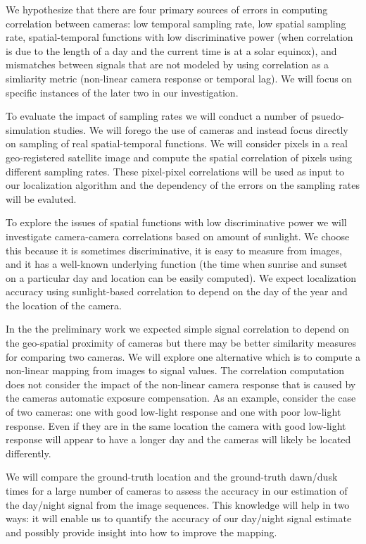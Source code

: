 We hypothesize that there are four primary sources of errors in
computing correlation between cameras: low temporal sampling rate, low
spatial sampling rate, spatial-temporal functions with low
discriminative power (\eg when correlation is due to the length of a
day and the current time is at a solar equinox), and mismatches
between signals that are not modeled by using correlation as a
simliarity metric (\eg non-linear camera response or temporal lag).
We will focus on specific instances of the later two in our
investigation. 

To evaluate the impact of sampling rates we will conduct a number of
psuedo-simulation studies.  We will forego the use of cameras and
instead focus directly on sampling of real spatial-temporal functions.
We will consider pixels in a real geo-registered satellite image and
compute the spatial correlation of pixels using different sampling
rates.  These pixel-pixel correlations will be used as input to our
localization algorithm and the dependency of the errors on the
sampling rates will be evaluted.

To explore the issues of spatial functions with low discriminative
power we will investigate camera-camera correlations based on amount
of sunlight.  We choose this because it is sometimes discriminative,
it is easy to measure from images, and it has a well-known underlying
function (\ie the time when sunrise and sunset on a particular day and
location can be easily computed).  We expect localization accuracy
using sunlight-based correlation to depend on the day of the year and
the location of the camera.

In the the preliminary work we expected simple signal correlation to
depend on the geo-spatial proximity of cameras but there may be better
similarity measures for comparing two cameras.  We will explore one
alternative which is to compute a non-linear mapping from images to
signal values.  The correlation computation does not consider the
impact of the non-linear camera response that is caused by the cameras
automatic exposure compensation.  As an example, consider the case of
two cameras: one with good low-light response and one with poor
low-light response.  Even if they are in the same location the camera
with good low-light response will appear to have a longer day and the
cameras will likely be located differently.

We will compare the ground-truth location and the ground-truth
dawn/dusk times for a large number of cameras to assess the accuracy
in our estimation of the day/night signal from the image sequences.
This knowledge will help in two ways: it will enable us to quantify
the accuracy of our day/night signal estimate and possibly provide
insight into how to improve the mapping.

